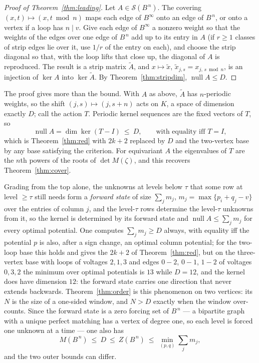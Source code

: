 \begin{proof}[Proof of Theorem~\ref{thm:leading}]
Let $A\in\mathcal S(B^{\,n})$. The covering $(x,t)\mapsto(x,t\bmod n)$ maps each
edge of $B^{\infty}$ onto an edge of $B^{\,n}$, or onto a vertex if a loop has
$n\mid v$. Give each edge of $B^{\infty}$ a nonzero weight so that the weights
of the edges over one edge of $B^{\,n}$ add up to its entry in $A$ (if $r\ge1$
classes of strip edges lie over it, use $1/r$ of the entry on each), and
choose the strip diagonal so that, with the loop lifts that close up, the
diagonal of $A$ is reproduced. The result is a strip matrix $\tilde A$, and
$x\mapsto\tilde x$, $\tilde x_{j,s}=x_{j,\,s\bmod n}$, is an injection of
$\ker A$ into $\ker\tilde A$. By Theorem~\ref{thm:stripdim},
$\operatorname{null}A\le D$.
\end{proof}

\begin{remark}\label{rem:monodromy}
The proof gives more than the bound. With $A$ as above, $\tilde A$ has
$n$-periodic weights, so the shift $(j,s)\mapsto(j,s+n)$ acts on $K$, a space
of dimension exactly $D$; call the action $T$. Periodic kernel sequences are the
fixed vectors of $T$, so
\[
  \operatorname{null}A=\dim\ker(T-I)\ \le\ D,\qquad\text{with equality iff }T=I ,
\]
which is Theorem~\ref{thm:red} with $2k+2$ replaced by $D$ and the two-vertex
base by any base satisfying the criterion. For equivariant $A$ the
eigenvalues of $T$ are the $n$th powers of the roots of $\det M(\zeta)$, and
this recovers Theorem~\ref{thm:cover}.
\end{remark}

\begin{remark}\label{rem:onegrading}
Grading from the top alone, the unknowns at levels below $\tau$ that some row
at level $\ge\tau$ still needs form a \emph{forward state} of size
$\sum_jm_j$, $m_j=\max\{p_i+q_j-v\}$ over the entries of column $j$, and the
level-$\tau$ rows determine the level-$\tau$ unknowns from it, so the kernel is
determined by its forward state and $\operatorname{null}A\le\sum_jm_j$ for
every optimal potential. One computes $\sum_jm_j\ge D$ always, with equality
iff the potential $p$ is also, after a sign change, an optimal column
potential; for the two-loop base this holds and gives the $2k+2$ of
Theorem~\ref{thm:red}, but on the three-vertex base with loops of voltages
$2,1,3$ and edges $0\!-\!2$, $0\!-\!1$, $1\!-\!2$ of voltages $0,3,2$ the
minimum over optimal potentials is $13$ while $D=12$, and the kernel does have
dimension $12$: the forward state carries one direction that never extends
backwards. Theorem~\ref{thm:order} is this phenomenon on two vertices: its
$N$ is the size of a one-sided window, and $N>D$ exactly when the window
over-counts. Since the forward state is a zero forcing set of $B^{\,n}$ --- a
bipartite graph with a unique perfect matching has a vertex of degree one, so
each level is forced one unknown at a time --- one also has
\[
  M(B^{\,n})\ \le\ D\ \le\ Z(B^{\,n})\ \le\ \min_{(p,q)}\sum_jm_j ,
\]
and the two outer bounds can differ.
\end{remark}


